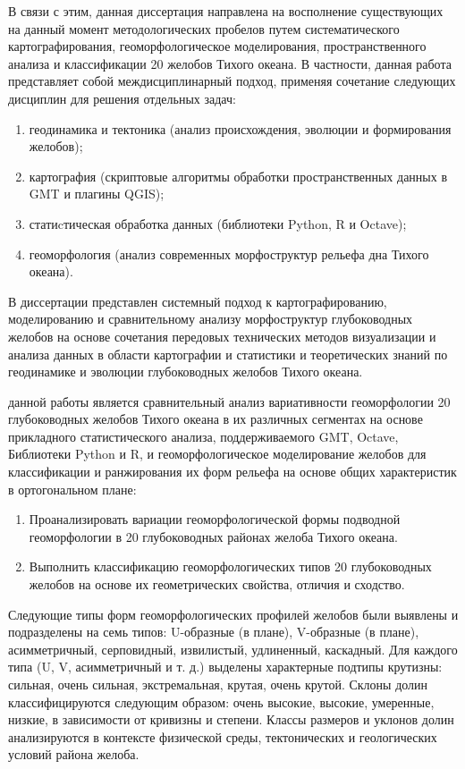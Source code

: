 В связи с этим, данная диссертация направлена на восполнение существующих на данный момент методологических пробелов путем систематического картографирования, геоморфологическое моделирования, пространственного анализа и классификации 20 желобов Тихого океана. В частности, данная работа представляет собой междисциплинарный подход, применяя сочетание следующих дисциплин для решения отдельных задач: 

\begin{enumerate}[label=(\roman*)]
	\item геодинамика и тектоника (анализ происхождения, эволюции и формирования желобов); 
	\item картография (скриптовые алгоритмы обработки пространственных данных в GMT и плагины QGIS); 
	\item статиcтическая обработка данных (библиотеки Python, R и Octave); 
	\item геоморфология (анализ современных морфоструктур рельефа дна Тихого океана). 
\end{enumerate}

В диссертации представлен системный подход к картографированию, моделированию и сравнительному анализу морфоструктур глубоководных желобов на основе сочетания передовых технических методов визуализации и анализа данных в области картографии и статистики и теоретических знаний по геодинамике и эволюции глубоководных желобов Тихого океана.


{\aim} данной работы является сравнительный анализ вариативности геоморфологии 20 глубоководных желобов Тихого океана в их различных сегментах на основе прикладного статистического анализа, поддерживаемого GMT, Octave, Библиотеки Python и R, и геоморфологическое моделирование желобов для классификации и ранжирования их форм рельефа на основе общих характеристик в ортогональном плане:
\begin{enumerate}
    \item Проанализировать вариации геоморфологической формы подводной геоморфологии в 20 глубоководных районах желоба Тихого океана. 
    \item Выполнить классификацию геоморфологических типов 20 глубоководных желобов на основе их геометрических свойства, отличия и сходство. 
\end{enumerate}
Следующие типы форм геоморфологических профилей желобов были выявлены и подразделены на семь типов: U-образные (в плане), V-образные (в плане), асимметричный, серповидный, извилистый, удлиненный, каскадный. Для каждого типа (U, V, асимметричный и т. д.) выделены характерные подтипы крутизны: сильная, очень сильная, экстремальная, крутая, очень крутой. Склоны долин классифицируются следующим образом: очень высокие, высокие, умеренные, низкие, в зависимости от кривизны и степени. Классы размеров и уклонов долин анализируются в контексте физической среды, тектонических и геологических условий района желоба.

